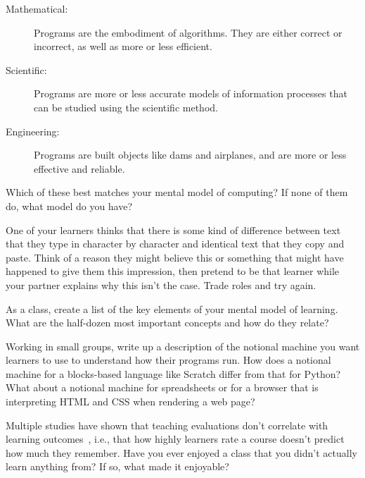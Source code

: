 \begin{description}

\item[Mathematical:]
  Programs are the embodiment of algorithms.
  They are either correct or incorrect,
  as well as more or less efficient.

\item[Scientific:]
  Programs are more or less accurate models of information processes
  that can be studied using the scientific method.

\item[Engineering:]
  Programs are built objects like dams and airplanes,
  and are more or less effective and reliable.

\end{description}

Which of these best matches your mental model of computing?
If none of them do, what model do you have?


One of your learners thinks that there is some kind of difference between
text that they type in character by character
and identical text that they copy and paste.
Think of a reason they might believe this
or something that might have happened to give them this impression,
then pretend to be that learner while your partner explains why this isn't the case.
Trade roles and try again.


As a class,
create a list of the key elements of your mental model of learning.
What are the half-dozen most important concepts and how do they relate?


Working in small groups,
write up a description of the notional machine you want learners to use
to understand how their programs run.
How does a notional machine for a blocks-based language like Scratch
differ from that for Python?
What about a notional machine for spreadsheets
or for a browser that is interpreting HTML and CSS when rendering a web page?


Multiple studies have shown that
teaching evaluations don't correlate with learning outcomes~\cite{Star2014,Uttl2017},
i.e.,
that how highly learners rate a course doesn't predict how much they remember.
Have you ever enjoyed a class that you didn't actually learn anything from?
If so, what made it enjoyable?
